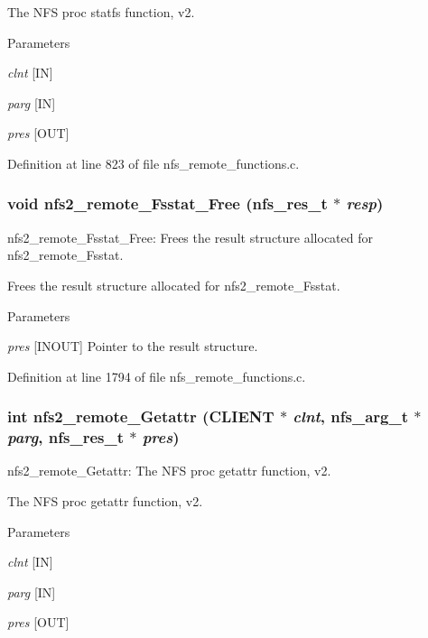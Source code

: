 The NFS proc statfs function, v2.


\begin{DoxyParams}{Parameters}
\item[{\em clnt}][IN] \item[{\em parg}][IN] \item[{\em pres}][OUT] \end{DoxyParams}


Definition at line 823 of file nfs\_\-remote\_\-functions.c.
\subsubsection[{nfs2\_\-remote\_\-Fsstat\_\-Free}]{\setlength{\rightskip}{0pt plus 5cm}void nfs2\_\-remote\_\-Fsstat\_\-Free (nfs\_\-res\_\-t $\ast$ {\em resp})}\label{group__NFSprocs_ga22a37656c62766455150ae86f45de6e7}
nfs2\_\-remote\_\-Fsstat\_\-Free: Frees the result structure allocated for nfs2\_\-remote\_\-Fsstat.

Frees the result structure allocated for nfs2\_\-remote\_\-Fsstat.


\begin{DoxyParams}{Parameters}
\item[{\em pres}][INOUT] Pointer to the result structure. \end{DoxyParams}


Definition at line 1794 of file nfs\_\-remote\_\-functions.c.
\subsubsection[{nfs2\_\-remote\_\-Getattr}]{\setlength{\rightskip}{0pt plus 5cm}int nfs2\_\-remote\_\-Getattr (CLIENT $\ast$ {\em clnt}, \/  nfs\_\-arg\_\-t $\ast$ {\em parg}, \/  nfs\_\-res\_\-t $\ast$ {\em pres})}\label{group__NFSprocs_ga50863b383bcaca2d6f036e19f45a272a}
nfs2\_\-remote\_\-Getattr: The NFS proc getattr function, v2.

The NFS proc getattr function, v2.


\begin{DoxyParams}{Parameters}
\item[{\em clnt}][IN] \item[{\em parg}][IN] \item[{\em pres}][OUT] \end{DoxyParams}


